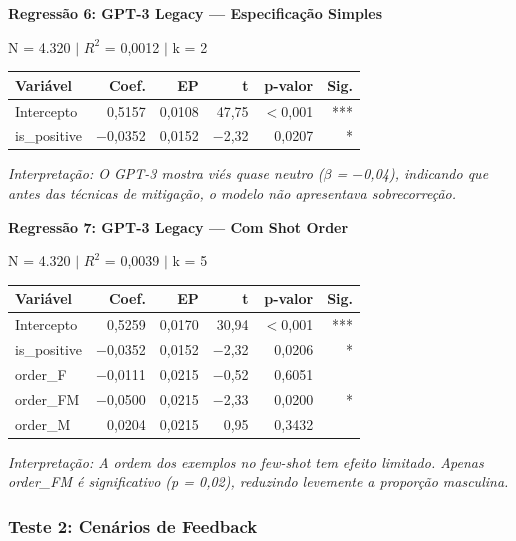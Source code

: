 \documentclass[12pt,a4paper]{article}
\begin{document}
\vspace{0.5cm}
\noindent\textbf{Regressão 6: GPT-3 Legacy --- Especificação Simples}

\noindent N = 4.320 $|$ $R^2$ = 0,0012 $|$ k = 2

\begin{table}[H]
\centering
\begin{tabular}{lrrrrr}
\toprule
\textbf{Variável} & \textbf{Coef.} & \textbf{EP} & \textbf{t} & \textbf{p-valor} & \textbf{Sig.} \\
\midrule
Intercepto & 0,5157 & 0,0108 & 47,75 & $<$0,001 & *** \\
is\_positive & $-$0,0352 & 0,0152 & $-$2,32 & 0,0207 & * \\
\bottomrule
\end{tabular}
\end{table}

\noindent\textit{Interpretação: O GPT-3 mostra viés quase neutro ($\beta$ = $-$0,04), indicando
que antes das técnicas de mitigação, o modelo não apresentava
sobrecorreção.}

\vspace{0.5cm}
\noindent\textbf{Regressão 7: GPT-3 Legacy --- Com Shot Order}

\noindent N = 4.320 $|$ $R^2$ = 0,0039 $|$ k = 5

\begin{table}[H]
\centering
\begin{tabular}{lrrrrr}
\toprule
\textbf{Variável} & \textbf{Coef.} & \textbf{EP} & \textbf{t} & \textbf{p-valor} & \textbf{Sig.} \\
\midrule
Intercepto & 0,5259 & 0,0170 & 30,94 & $<$0,001 & *** \\
is\_positive & $-$0,0352 & 0,0152 & $-$2,32 & 0,0206 & * \\
order\_F & $-$0,0111 & 0,0215 & $-$0,52 & 0,6051 & \\
order\_FM & $-$0,0500 & 0,0215 & $-$2,33 & 0,0200 & * \\
order\_M & 0,0204 & 0,0215 & 0,95 & 0,3432 & \\
\bottomrule
\end{tabular}
\end{table}

\noindent\textit{Interpretação: A ordem dos exemplos no few-shot tem efeito limitado.
Apenas order\_FM é significativo (p = 0,02), reduzindo levemente a
proporção masculina.}


\subsubsection{Teste 2: Cenários de Feedback}
\end{document}
